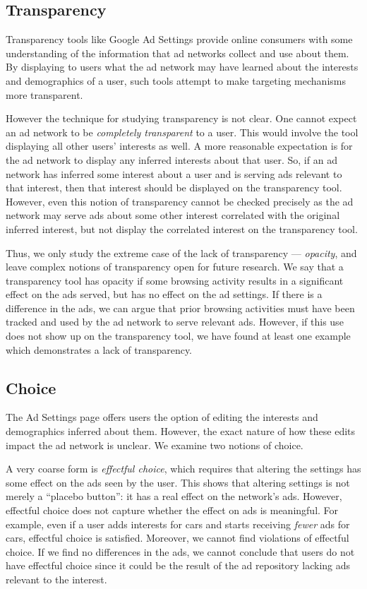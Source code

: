 \documentclass{article}
\begin{document}
\subsection{Transparency}

Transparency tools like Google Ad Settings provide online consumers with some understanding of the information that ad networks collect and use about them. By displaying to users what the ad network may have learned about the interests and demographics of a user, such tools attempt to make targeting mechanisms more transparent. 



However the technique for studying transparency is not clear. One cannot expect an ad network to be \emph{completely transparent} to a user. This would involve the tool displaying all other users' interests as well. A more reasonable expectation is for the ad network to display any inferred interests about that user. So, if an ad network has inferred some interest about a user and is serving ads relevant to that interest, then  that interest should be displayed on the transparency tool. 
However, even this notion of transparency cannot be checked precisely as the ad network may serve ads about some other interest correlated with the original inferred interest, but not display the correlated interest on the transparency tool. 

Thus, we only study the extreme case of the lack of transparency --- \emph{opacity}, and leave complex notions of transparency open for future research. We say that a transparency tool has opacity if some browsing activity results in 
a significant effect on the ads served, but has no effect on the ad settings. If there is a difference in the ads, we can argue that prior browsing activities must have been tracked and used by the ad network to serve relevant ads. However, if this use does not show up on the transparency tool, we have found at least one example which demonstrates a lack of transparency. 


\subsection{Choice}

The Ad Settings page offers users the option of editing the interests and demographics inferred about them.
However, the exact nature of how these edits impact the ad network is unclear.  
We examine two notions of choice.  

A very coarse form is \emph{effectful choice}, which requires that altering the settings has some effect on the ads seen by the user.  
This shows that altering settings is not merely a ``placebo button'': it has a real effect on the network's ads. However, effectful choice does not capture whether the effect on ads is meaningful. For example, even if a user adds interests for cars and starts receiving \emph{fewer} ads for cars, effectful choice is satisfied. 
Moreover, we cannot find violations of effectful choice. 
If we find no differences in the ads, we cannot conclude that users do not have effectful choice since it could be the result of the ad repository lacking ads relevant to the interest.
\end{document}
